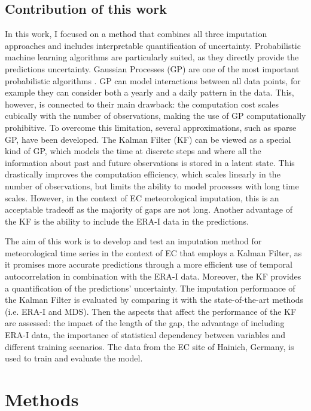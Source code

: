 \documentclass{article}
\let\Oldsection\section
\renewcommand{\section}{\FloatBarrier\Oldsection}
\let\Oldsubsection\subsection
\renewcommand{\subsection}{\FloatBarrier\Oldsubsection}
\begin{document}
\subsection{Contribution of this work}
In this work, I focused on a method that combines all three imputation approaches and includes interpretable quantification of uncertainty. Probabilistic machine learning algorithms are particularly suited, as they directly provide the predictions uncertainty.
Gaussian Processes (GP) are one of the most important probabilistic algorithms \cite{2020_hennig_pml}. GP can model interactions between all data points, for example they can consider both a yearly and a daily pattern in the data. This, however, is connected to their main drawback: the computation cost scales cubically with the number of observations, making the use of GP computationally prohibitive. To overcome this limitation, several approximations, such as sparse GP, have been developed. 
The Kalman Filter (KF) can be viewed as a special kind of GP, which models the time at discrete steps and where all the information about past and future observations is stored in a latent state. This drastically improves the computation efficiency, which scales linearly in the number of observations, but limits the ability to model processes with long time scales. However, in the context of EC meteorological imputation, this is an acceptable tradeoff as the majority of gaps are not long. Another advantage of the KF is the ability to include the ERA-I data in the predictions.

The aim of this work is to develop and test an imputation method for meteorological time series in the context of EC that employs a Kalman Filter, as it promises more accurate predictions through a more efficient use of temporal autocorrelation in combination with the ERA-I data. Moreover, the KF provides a quantification of the predictions' uncertainty.
The imputation performance of the Kalman Filter is evaluated by comparing it with the state-of-the-art methods (i.e. ERA-I and MDS). Then the aspects that affect the performance of the KF are assessed: the impact of the length of the gap, the advantage of including ERA-I data, the importance of statistical dependency between variables and different training scenarios. The data from the EC site of Hainich, Germany, is used to train and evaluate the model.


\section{Methods}
\end{document}
